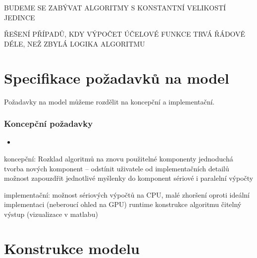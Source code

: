 

BUDEME SE ZABÝVAT ALGORITMY S KONSTANTNÍ VELIKOSTÍ JEDINCE

ŘEŠENÍ PŘÍPADŮ, KDY VÝPOČET ÚČELOVÉ FUNKCE TRVÁ ŘÁDOVĚ DÉLE, NEŽ ZBYLÁ LOGIKA ALGORITMU

\section{Specifikace požadavků na model}

Požadavky na model můžeme rozdělit na koncepční a implementační. 

\subsubsection{Koncepční požadavky}




\begin{itemize}
  \item
\end{itemize}

koncepční:
Rozklad algoritmů na znovu použitelné komponenty
jednoduchá tvorba nových komponent -- odstínit uživatele od implementačních detailů
možnost zapouzdřit jednotlivé myšlenky do komponent
sériové i paralelní výpočty

implementační:
možnost sériových výpočtů na CPU, malé zhoršení oproti ideální implementaci (neberoucí ohled na GPU)
runtime konstrukce algoritmu
čitelný výstup (vizualizace v matlabu)

\section{Konstrukce modelu} 